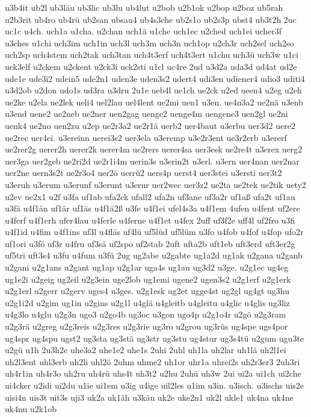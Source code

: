 {u3b4it
ub2l
ub3läu
ub3lic
ub3lu
ub4lut
u2bob
u2b1ok
u2bop
u2boz
ub5rah
u2b3rit
ub4ro
ub4rü
ub2san
ubsau4
ub4s3che
ub2s1o
ub2s3p
ubst4
ub3t2h
2uc
uc1c
u4ch.
uch1a
u1cha.
u2chan
uch1ä
u1che
uch1ec
u2ched
uch1ei
ucher3f
u3ches
u1chi
uch3im
uch1in
uch3l
uch3m
uch3n
uch1op
u2ch3r
uch2sel
uch2so
uch2sp
uch4stem
uch2tak
uch3tan
uch4t3erf
uch4t3ert
u1chu
uch3ü
uch3w
u1ci
uck3elf
u2ckem
u2ckent
u2ck3i
uck2sti
u1cl
uc4re
2ud
u3d2a
uda3d
ud4at
ud2e
ude1e
ude3i2
udein5
ude2n1
uden3e
uden3s2
udert4
udi3en
udiener4
udio3
uditi4
u3d2ob
u2don
udo1s
ud3ra
u3dru
2u1e
ueb4l
ue1ch
ue2ck
u2ed
ueen4
u2eg
u2eh
ue2ke
u2ela
ue2lek
ueli4
uel2lau
uel4lent
ue2mi
uen1
u3en.
ue4n3a2
ue2nä
u3enb
u3end
uene2
ue2neb
ue2ner
uen2gag
uenge2
uenge4m
uengene3
uen2gl
ue2ni
uenk4
ue2no
uen2zu
u2ep
ue2r3a2
ue2r1ä
uerb2
uer4baut
u3erbu
uer3d2
uere2
ue2rec
uer4ei.
u3ereinn
uerei3s2
uer3ela
u3eremp
u3e2r3ent
ue3r2erb
u3ererf
ue2rer2g
uerer2h
uerer2k
uerer4m
ue2rers
uerer4sa
uer3esk
ue2re4t
u3erex
uerg2
uer3ga
uer2geb
ue2ri2d
ue2r1i4m
uerin3s
u3erin2t
u3erl.
u3ern
uer4nan
uer2nar
uer2ne
uern3s2t
ue2r3o4
uer2ö
uerrü2
uers4p
uerst4
uer3stei
u3ersti
uer3t2
u3eruh
u3erum
u3erunf
u3erunt
u3erur
uer2wec
uer3z2
ue2ta
ue2tek
ue2tik
uety2
u2ev
ue2x1
u2f
u3fa
uf1ab
ufa2ck
ufall2
ufa2n
uf3ane
uf3a2r
uf1aß
ufa2t
uf1au
u3fä
u4f1än
uf1är
uf1äs
u4f1ä2ß
u3fe
u4f1ei
ufel4s3a
u4f1em
4ufen
u4fent
uf2ere
u4ferf
u4f1erh
ufer4lau
u4ferle
u4ferne
u4f1et
u4fex
2uff
uf3f2e
uff4l
uf2fro
u3fi
u4f1id
u4fim
u4f1ins
uf3l
u4fläs
uf4lü
uf5lüd
uf5lüm
u3fo
u4fob
u4fof
u4fop
ufo2r
uf1ori
u3fö
uf3r
u4fru
uf3sä
uf2spo
uf2stab
2uft
ufta2b
uft1eb
uft3erd
uft3er2g
uf5tri
uft3s4
u3fu
u4fum
u3fü
2ug
ug2abe
u2gabte
ug1a2d
ug1ak
u2gana
u2ganb
u2gani
u2g1ans
u2gant
ug1ap
u2g1ar
uga4s
ug1au
ug3d2
u3ge.
u2g1ec
ug4eg
ug1e2i
u2geig
ug2eil
u2g3ein
uge2lob
ug1emi
ugene2
ugen3s2
u2g1erf
u2g1erk
u2g1erl
u2gerr
u2gerv
uges4
u3ges.
u2g1esk
ug2et
ugge4st
ug2gl
ug4gt
ug3hu
u2g1i2d
u2gim
ug1in
u2gins
u2g1l
u4glä
u4gleitb
u4gleitu
u4glic
u4glis
ug3liz
u4g3lo
u4glu
u2g3n
ugo3
u2go4b
ug3oc
u3gon
ugo4p
u2g1o4r
u2gö
u2g3ram
u2g3rä
u2greg
u2g3reis
u2g3res
u2g3rie
ug3ro
u2grou
ug3rüs
ug4spe
ugs4por
ug4spr
ug4spu
ugst2
ug3sta
ug3stä
ug3str
ug3stu
ug4stur
ug3s4tü
u2gum
ugu3te
u2gü
u1h
2u3h2e
uhe3a2
uhe1e2
uhe1s
2uhi
2uhl
uh1la
uh2lar
uh1lä
uh2l1ei
uh2l3ent
uhl3erb
uh2li
uhl2ö
2uhm
uhme2
uh1or
uhr1a
uhrei2s
uh2r3er3
2uh3ri
uh4r1in
uh4r3o
uh2ru
uh4rü
uhs4t
uh3t2
u2hu
2uhü
uh3w
2ui
ui2a
ui1ch
ui2che
ui4cker
u2idi
ui2du
u1ie
ui1em
u3ig
u4ige
uil2les
u1im
u3in.
u3isch.
u3ischs
uis2e
uisi4n
uis3t
uit3s
uji3
uk2a
uk1äh
u3käu
uk2e
uke2n1
uk2l
ukle1
uk4na
uk4ne
uk4nu
u2k1ob
}
